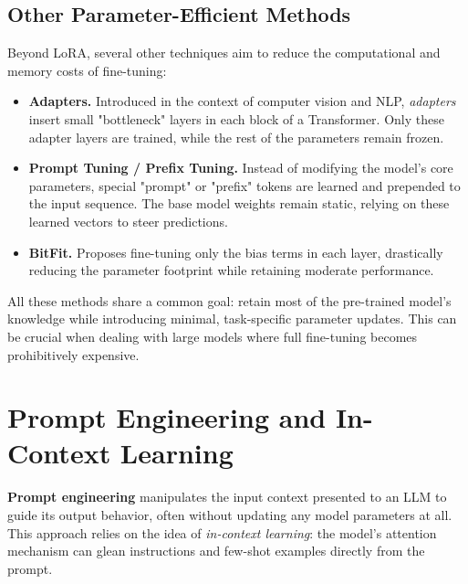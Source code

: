 \subsection{Other Parameter-Efficient Methods}
\noindent
Beyond LoRA, several other techniques aim to reduce the computational and memory costs of fine-tuning:
\begin{itemize}
    \item \textbf{Adapters.} Introduced in the context of computer vision and NLP, \emph{adapters} insert small "bottleneck" layers in each block of a Transformer. Only these adapter layers are trained, while the rest of the parameters remain frozen.
    \item \textbf{Prompt Tuning / Prefix Tuning.} Instead of modifying the model's core parameters, special "prompt" or "prefix" tokens are learned and prepended to the input sequence. The base model weights remain static, relying on these learned vectors to steer predictions.
    \item \textbf{BitFit.} Proposes fine-tuning only the bias terms in each layer, drastically reducing the parameter footprint while retaining moderate performance.
\end{itemize}

\noindent
All these methods share a common goal: retain most of the pre-trained model's knowledge while introducing minimal, task-specific parameter updates. This can be crucial when dealing with large models where full fine-tuning becomes prohibitively expensive.

\section{Prompt Engineering and In-Context Learning}
\label{sec:prompt_engineering}

\noindent
\textbf{Prompt engineering} manipulates the input context presented to an LLM to guide its output behavior, often without updating any model parameters at all. This approach relies on the idea of \emph{in-context learning}: the model's attention mechanism can glean instructions and few-shot examples directly from the prompt.


